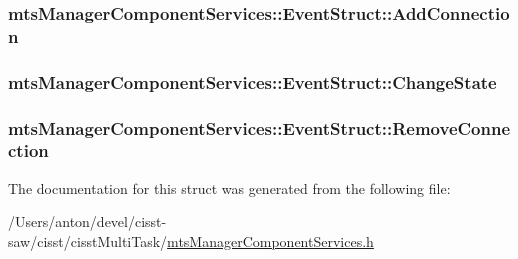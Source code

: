 \subsubsection[{Add\+Connection}]{ mts\+Manager\+Component\+Services\+::\+Event\+Struct\+::\+Add\+Connection}\label{structmts_manager_component_services_1_1_event_struct_a6e99e7d1807c8eb2dfcc7ffe670d7ddb}
\hypertarget{structmts_manager_component_services_1_1_event_struct_a9b69075f40fdc89a7df1d635ce388946}{}
\subsubsection[{Change\+State}]{ mts\+Manager\+Component\+Services\+::\+Event\+Struct\+::\+Change\+State}\label{structmts_manager_component_services_1_1_event_struct_a9b69075f40fdc89a7df1d635ce388946}
\hypertarget{structmts_manager_component_services_1_1_event_struct_ac10cc608ffc0312aaeb4c3860e1c24c2}{}
\subsubsection[{Remove\+Connection}]{ mts\+Manager\+Component\+Services\+::\+Event\+Struct\+::\+Remove\+Connection}\label{structmts_manager_component_services_1_1_event_struct_ac10cc608ffc0312aaeb4c3860e1c24c2}


The documentation for this struct was generated from the following file\+:\begin{DoxyCompactItemize}
\item 
/\+Users/anton/devel/cisst-\/saw/cisst/cisst\+Multi\+Task/\hyperlink{mts_manager_component_services_8h}{mts\+Manager\+Component\+Services.\+h}\end{DoxyCompactItemize}
